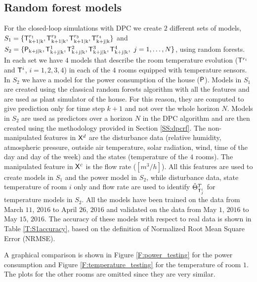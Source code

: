 \subsection{Random forest models}
\label{SS:randomForestsModels}
For the closed-loop simulations with DPC we create $2$ different sets of models, $S_1 = \{\mathsf{T}^{r_1}_{\mathrm{k+1|k}},\mathsf{T}^{r_2}_{\mathrm{k+1|k}},\mathsf{T}^{r_3}_{\mathrm{k+1|k}},\mathsf{T}^{r_4}_{\mathrm{k+j|k}}\}$ and $S_2 = \{\tP_{\mathrm{k+j|k}},\tT^{1}_{\mathrm{k+j|k}},\tT^{2}_{\mathrm{k+j|k}},\tT^{3}_{\mathrm{k+j|k}},\\\tT^{4}_{\mathrm{k+j|k}},\ j = 1,\ldots,N\}$, using random forests. In each set we have  $4$ models that describe the room temperature evolution ($\mathsf{T}^{r_i}$ and $\mathsf{T}^i$, $i=1,2,3,4$) in each of the $4$ rooms equipped with temperature sensors. In $S_2$ we have a model for the power consumption of the house ($\mathsf{P}$). Models in $S_1$ are created using the classical random forests algorithm with all the features and are used as plant simulator of the house. For this reason, they are computed to give prediction only for time step $k+1$ and not over the whole horizon $N$. Models in $S_2$ are used as predictors over a horizon $N$ in the DPC algorithm and are then created using the methodology provided in Section \ref{SS:dpcrf}. The non-manipulated features in $\mathsf{X}^d$ are the disturbance data (relative humidity, atmospheric pressure, outside air temperature, solar radiation, wind, time of the day and day of the week) and the states (temperature of the $4$ rooms). The manipulated feature in $\mathsf{X}^c$ is the flow rate ($[m^3/h]$). All this features are used to create models in $S_1$ and the power model in $S_2$, while disturbance data, state temperature of room $i$ only and flow rate are used to identify $\hat{\Theta}^{T}_{\mathsf{T}^i_j}$ for temperature models in $S_2$. All the models have been trained on the data from March $11$, $2016$ to April $26$, $2016$ and validated on the data from May $1$, $2016$ to May $15$, $2016$. The accuracy of these models with respect to real data is shown in Table \ref{T:S1accuracy}, based on the definition of Normalized Root Mean Square Error (NRMSE).

A graphical comparison is shown in Figure \ref{F:power_testing} for the power consumption and Figure \ref{F:temperature_testing} for the temperature of room $1$. The plots for the other rooms are omitted since they are very similar.


